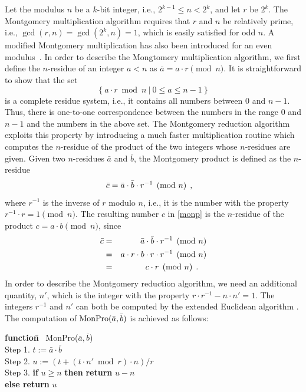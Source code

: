 \documentclass[twocolumn]{svjour3}          %
\begin{document}
Let the modulus $n$ be a $k$-bit integer, i.e., $2^{k-1} \leq n < 2^k$,
and let $r$ be $2^k$. The Montgomery multiplication algorithm requires
that $r$ and $n$ be relatively prime, i.e., $\gcd(r,n)=\gcd(2^k,n)=1$,
which is easily satisfied for odd $n$.
A modified Montgomery multiplication has also been introduced for an
even modulus~\cite{K94:Montgomery}.
In order to describe the Mongtomery multiplication algorithm, we first
define the $n$-residue of an integer $a<n$ as
$\bar{a}=a \cdot r \pmod{n}$.
It is straightforward to show that the set
\[
\{~ a \cdot r \bmod{n} ~|~ 0 \leq a \leq n-1 ~\}
\]
is a complete residue system, i.e.,
it contains all numbers between $0$ and $n-1$.
Thus, there is one-to-one correspondence between the numbers in the range
$0$ and $n-1$ and the numbers in the above set. The Montgomery reduction
algorithm exploits this property by introducing a much faster
multiplication routine which computes the $n$-residue of the product of
the two integers whose $n$-residues are given.
Given two $n$-residues $\bar{a}$ and $\bar{b}$,
the Montgomery product is defined as the $n$-residue
%
\begin{equation}
\bar{c}=\bar{a} \cdot \bar{b} \cdot r^{-1} \pmod{n} \label{monp}
\mbox{\hspace*{1ex}\mbox{,}\hspace*{1em}}
\end{equation}
%
where $r^{-1}$ is the inverse of $r$ modulo $n$, i.e., it is the number with
the property $r^{-1} \cdot r = 1 \pmod{n}$.
The resulting number $c$ in \eqref{monp} is
the $n$-residue of the product $c=a \cdot b \pmod{n}$, since
%
\begin{eqnarray*}
\bar{c} & = & \bar{a} \cdot \bar{b} \cdot r^{-1} \pmod{n} \\
        & = & a \cdot r \cdot b \cdot r \cdot r^{-1} \pmod{n} \\
        & = & c \cdot r \pmod{n} \mbox{\hspace*{1ex}\mbox{.}\hspace*{1em}}
\end{eqnarray*}
%
In order to describe the Montgomery reduction algorithm, we need an additional
quantity, $n'$, which is the integer with the property
$r \cdot r^{-1} - n \cdot n' = 1$.
The integers $r^{-1}$ and $n'$ can both be computed by the extended
Euclidean algorithm \cite{K81:Seminumerical,R93:Elementary}.
The computation of $\mbox{MonPro}(\bar{a},\bar{b})$ is achieved as follows:

\begin{tabbing}
\hspace*{.2in}\={\bf function}\= ~MonPro($\bar{a},\bar{b}$)\\
\>Step 1. $t := \bar{a} \cdot \bar{b}$\\
\>Step 2. $u := (t + (t \cdot n' \bmod{r}) \cdot n)/r$\\
\>Step 3. {\bf if} $u \geq n$ {\bf then } 
{\bf return} $u-n$ \\
\> \> {\bf else return} $u$
\end{tabbing}
\end{document}
